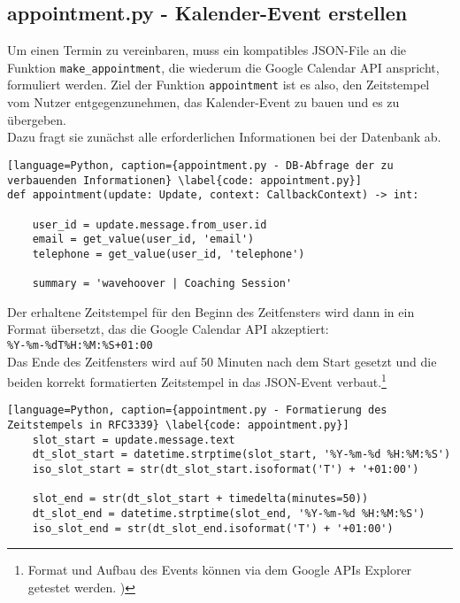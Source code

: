         \subsection{appointment.py - Kalender-Event erstellen} \label{Implementierung: appointment.py}
            Um einen Termin zu vereinbaren, muss ein kompatibles JSON-File an die Funktion \verb|make_appointment|, die wiederum die Google Calendar API anspricht, formuliert werden. Ziel der Funktion \verb|appointment| ist es also, den Zeitstempel vom Nutzer entgegenzunehmen, das Kalender-Event zu bauen und es zu übergeben. \\
            Dazu fragt sie zunächst alle erforderlichen Informationen bei der Datenbank ab. 

            \begin{lstlisting}[language=Python, caption={appointment.py - DB-Abfrage der zu verbauenden Informationen} \label{code: appointment.py}]
def appointment(update: Update, context: CallbackContext) -> int:

    user_id = update.message.from_user.id
    email = get_value(user_id, 'email')
    telephone = get_value(user_id, 'telephone')
    
    summary = 'wavehoover | Coaching Session'
            \end{lstlisting}
            
            Der erhaltene Zeitstempel für den Beginn des Zeitfensters wird dann in ein Format übersetzt, das die Google Calendar API akzeptiert: \\ 
            \verb/%Y-%m-%dT%H:%M:%S+01:00/ \\
            Das Ende des Zeitfensters wird auf 50 Minuten nach dem Start gesetzt und die beiden korrekt formatierten Zeitstempel in das JSON-Event verbaut.\footnote{Format und Aufbau des Events können via dem Google APIs Explorer getestet werden. \cite{apiExplorer})}

            \begin{lstlisting}[language=Python, caption={appointment.py - Formatierung des Zeitstempels in RFC3339} \label{code: appointment.py}]
    slot_start = update.message.text
    dt_slot_start = datetime.strptime(slot_start, '%Y-%m-%d %H:%M:%S')
    iso_slot_start = str(dt_slot_start.isoformat('T') + '+01:00')

    slot_end = str(dt_slot_start + timedelta(minutes=50))
    dt_slot_end = datetime.strptime(slot_end, '%Y-%m-%d %H:%M:%S')
    iso_slot_end = str(dt_slot_end.isoformat('T') + '+01:00')
            \end{lstlisting}

